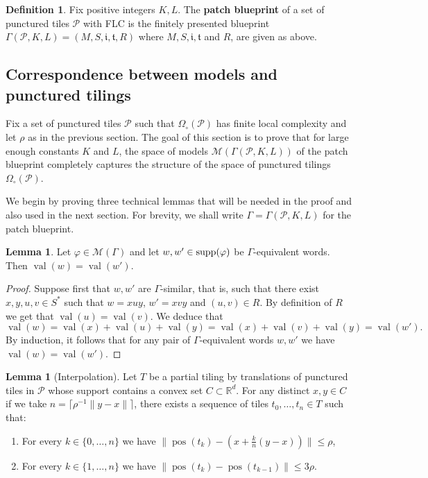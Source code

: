 \documentclass{article}
\theoremstyle{definition}
\newtheorem{lemma}[theorem]{Lemma}
\newtheorem{defn}[theorem]{Definition} %
\theoremstyle{definition}
\newcommand{\RR}{\mathbb{R}}
\newcommand{\PP}{\mathcal{P}}
\newcommand{\init}{\mathfrak{i}}
\newcommand{\ter}{\mathfrak{t}}
\newcommand{\norm}[1]{\|{#1}\|}
\newcommand{\val}{\operatorname{val}}
\newcommand{\pos}{\operatorname{pos}}
\newcommand{\supp}{\textnormal{supp}}
\newcommand{\define}[1]{\textbf{#1}}
\begin{document}
\begin{defn}\label{def:patchblueprint}
    Fix positive integers $K,L$. The \define{patch blueprint} of a set of punctured tiles $\PP$ with FLC is the finitely presented blueprint $\Gamma(\PP,K,L) = (M,S,\init,\ter,R)$ where $M, S, \init,\ter$ and $R$, are given as above.
\end{defn}

\subsection{Correspondence between models and punctured tilings}\label{appendix}
 Fix a set of punctured tiles $\PP$ such that $\Omega_\circ(\PP)$ has finite local complexity and let $\rho$ as in the previous section. The goal of this section is to prove that for large enough constants $K$ and $L$, the space of models $\mathcal{M}(\Gamma(\PP,K,L))$ of the patch blueprint completely captures the structure of the space of punctured tilings $\Omega_{\circ}(\PP)$.

We begin by proving three technical lemmas that will be needed in the proof and also used in the next section. For brevity, we shall write $\Gamma = \Gamma(\PP,K,L)$ for the patch blueprint.

\begin{lemma}\label{lem:valuation_is_well_defined}
    Let $\varphi \in \mathcal{M}(\Gamma)$ and let $w,w'\in \supp(\varphi)$ be $\Gamma$-equivalent words. Then $\val(w)=\val(w')$. 
\end{lemma}

\begin{proof}
    Suppose first that $w, w'$ are $\Gamma$-similar, that is, such that there exist $x,y,u,v\in S^*$ such that $w = xuy$, $w' = xvy$ and $(u,v)\in R$. By definition of $R$ we get that $\val(u)=\val(v)$. We deduce that
    $$\val(w) = \val(x) + \val(u) + \val(y) = \val(x) + \val(v) + \val(y) = \val(w').$$
    By induction, it follows that for any pair of $\Gamma$-equivalent words $w,w'$ we have $\val(w) = \val(w')$.
\end{proof}


\begin{lemma}[Interpolation]
\label{lem:sausage}
    Let $T$ be a partial tiling by translations of punctured tiles in $\PP$ whose support contains a convex set $C\subset \RR^d$. For any distinct $x,y \in C$ if we take $n = \lceil  \rho^{-1}\norm{y-x}\rceil$, there exists a sequence of tiles $t_0,\dots, t_{n}  \in T$ such that:
    \begin{enumerate}
        \item For every $k \in \{0,\dots,n\}$ we have $\norm{\pos(t_k)- (x +\frac{k}{n}(y-x))}\leq \rho$,
        \item For every $k \in \{1,\dots,n\}$ we have $\norm{\pos(t_k)-\pos(t_{k-1})}\leq 3\rho$.
        \end{enumerate}
\end{lemma}
\end{document}
